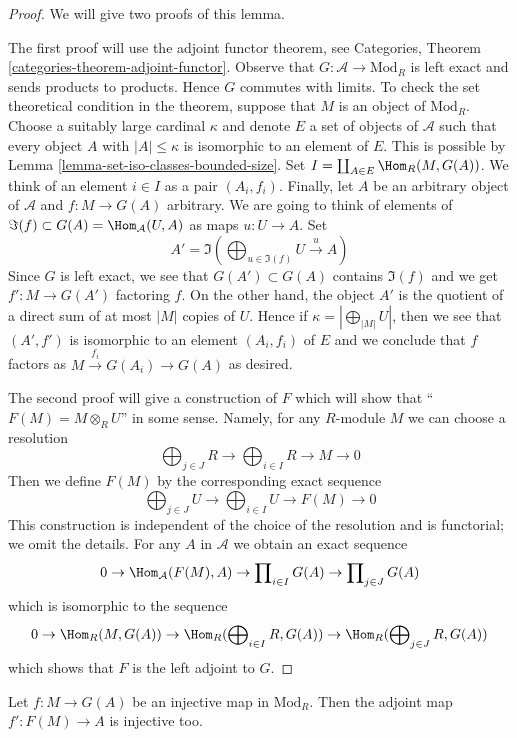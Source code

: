 \begin{proof}
We will give two proofs of this lemma.

\medskip\noindent
The first proof will use the adjoint functor theorem, see
Categories, Theorem \ref{categories-theorem-adjoint-functor}.
Observe that $G : \mathcal{A} \to \text{Mod}_R$ is left exact and sends
products to products. Hence $G$ commutes with limits. To check the set
theoretical condition in the theorem, suppose that $M$ is an object of
$\text{Mod}_R$. Choose a suitably large cardinal $\kappa$ and denote $E$
a set of objects of $\mathcal{A}$ such that every object $A$ with
$|A| \leq \kappa$ is isomorphic to an element of $E$. This is possible
by Lemma \ref{lemma-set-iso-classes-bounded-size}. Set
$I = \coprod_{A \in E} \Hom_R(M, G(A))$.
We think of an element $i \in I$ as a pair $(A_i, f_i)$.
Finally, let $A$ be an arbitrary object of $\mathcal{A}$
and $f : M \to G(A)$ arbitrary. We are going to think of
elements of $\Im(f) \subset G(A) = \Hom_\mathcal{A}(U, A)$
as maps $u : U \to A$. Set
$$
A' = \Im(\bigoplus\nolimits_{u \in \Im(f)} U \xrightarrow{u} A)
$$
Since $G$ is left exact, we see that $G(A') \subset G(A)$
contains $\Im(f)$ and we get $f' : M \to G(A')$ factoring $f$.
On the other hand, the object $A'$ is
the quotient of a direct sum of at most $|M|$ copies of $U$.
Hence if $\kappa = |\bigoplus_{|M|} U|$, then we see that $(A', f')$
is isomorphic to an element $(A_i, f_i)$ of $E$ and we conclude that $f$
factors as $M \xrightarrow{f_i} G(A_i) \to G(A)$ as desired.

\medskip\noindent
The second proof will give a construction of $F$ which will show
that ``$F(M) = M \otimes_R U$'' in some sense. Namely, for any
$R$-module $M$ we can choose a resolution
$$
\bigoplus\nolimits_{j \in J} R \to
\bigoplus\nolimits_{i \in I} R \to
M \to 0
$$
Then we define $F(M)$ by the corresponding exact sequence
$$
\bigoplus\nolimits_{j \in J} U \to
\bigoplus\nolimits_{i \in I} U \to
F(M) \to 0
$$
This construction is independent of the choice of the resolution
and is functorial; we omit the details.
For any $A$ in $\mathcal{A}$ we obtain an exact sequence
$$
0 \to \Hom_\mathcal{A}(F(M), A) \to
\prod\nolimits_{i \in I} G(A) \to
\prod\nolimits_{j \in J} G(A)
$$
which is isomorphic to the sequence
$$
0 \to \Hom_R(M, G(A)) \to
\Hom_R(\bigoplus\nolimits_{i \in I} R, G(A)) \to
\Hom_R(\bigoplus\nolimits_{j \in J} R, G(A))
$$
which shows that $F$ is the left adjoint to $G$.
\end{proof}

\begin{lemma}
\label{lemma-F-G-monos}
Let $f : M \to G(A)$ be an injective map in $\text{Mod}_R$.
Then the adjoint map $f' : F(M) \to A$ is injective too.
\end{lemma}

